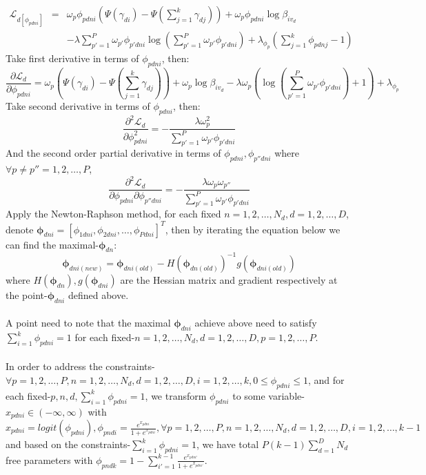\documentclass[a4paper]{article}
\newcommand{\be}{\begin{equation}}
\newcommand{\ee}{\end{equation}}
\newcommand{\bs}{\boldsymbol}
\newcommand{\ba}{\begin{array}}
\newcommand{\ea}{\end{array}}
\newcommand{\Sum}{\displaystyle\sum}
\begin{document}
\be\label{phi1}
\ba{rcl}
\mathcal{L}_{d[\phi_{pdni}]}&=&\omega_{p}\phi_{pdni}(\Psi(\gamma_{di})-\Psi(\sum_{j=1}^{k}\gamma_{dj}))+\omega_{p}\phi_{pdni}\log\beta_{iv_d}\\&&-\lambda\Sum_{p'=1}^{P}\omega_{p'}\phi_{p'dni}\log(\sum_{p'=1}^{P}\omega_{p'}\phi_{p'dni})
+\lambda_{\phi_p}(\sum_{j=1}^{k}\phi_{pdnj}-1)
\ea
\ee
Take first derivative in terms of $\phi_{pdni}$, then:\\
\[
\frac{\partial\mathcal{L}_d}{\partial \phi_{pdni}}=\omega_{p}(\Psi(\gamma_{di})-\Psi(\sum_{j=1}^{k}\gamma_{dj}))+\omega_{p}\log\beta_{iv_d}-\lambda\omega_{p}(\log(\sum_{p'=1}^{P}\omega_{p'}\phi_{p'dni})+1)+\lambda_{\phi_p}
\]
Take second derivative in terms of $\phi_{pdni}$, then:\\
\[
\frac{\partial^2\mathcal{L}_d}{\partial \phi^2_{pdni}}=-\frac{\lambda\omega_p^2}{\sum_{p'=1}^{P}\omega_{p'}\phi_{p'dni}}
\]
And the second order partial derivative  in terms of $\phi_{pdni},\phi_{p''dni}$ where $\forall p\neq p''=1,2,\ldots,P$,\\
\[
\frac{\partial^2\mathcal{L}_d}{\partial \phi_{pdni}\partial \phi_{p''dni}}=-\frac{\lambda\omega_p\omega_{p''}}{\sum_{p'=1}^{P}\omega_{p'}\phi_{p'dni}}
\]
Apply the Newton-Raphson method, for each fixed $n=1,2,\ldots,N_d,d=1,2,\ldots,D$, denote $\bs{\phi}_{dni}=[\phi_{1dni},\phi_{2dni},\ldots,\phi_{Pdni}]^T$, then by iterating the equation below we can find the maximal-$\bs{\phi}_{dn}$:\\
\[
\bs{\phi}_{dni(new)}=\bs{\phi}_{dni(old)}-H(\bs{\phi}_{dn(old)})^{-1}g(\bs{\phi}_{dni(old)})
\]
where $H(\bs{\phi}_{dn}),g(\bs{\phi}_{dni})$ are the Hessian matrix and gradient respectively at the point-$\bs{\phi}_{dni}$ defined above.\\
\\
A point need to note that the maximal $\bs{\phi}_{dni}$ achieve above need to satisfy $\Sum_{i=1}^{k}\phi_{pdni}=1$ for each fixed-$n=1,2,\ldots,N_d,d=1,2,\ldots,D,p=1,2,\ldots,P$.\\
\\
In order to address the constraints-$\forall p=1,2,\ldots,P,n=1,2,\ldots,N_d,d=1,2,\ldots,D,i=1,2,\ldots,k, 0\le\phi_{pdni}\le 1$, and for each fixed-$p,n,d,\Sum_{i=1}^{k}\phi_{pdni}=1$, we transform $\phi_{pdni}$ to some variable-$x_{pdni}\in(-\infty,\infty)$ with $x_{pdni}=logit(\phi_{pdni}),\phi_{pndi}=\frac{e^{x_{pdni}}}{1+e^{x_{pdni}}},\forall p
=1,2,\ldots,P,n=1,2,\ldots,N_d,d=1,2,\ldots,D,i=1,2,\ldots,k-1$ and based on the constraints-$\Sum_{i=1}^{k}\phi_{pdni}=1$, we have total $P(k-1)\sum_{d=1}^{D}N_d$ free parameters with $\phi_{pndk}=1-\Sum_{i'=1}^{k-1}\frac{e^{x_{pdni'}}}{1+e^{x_{pdni'}}}$.\\
\end{document}
